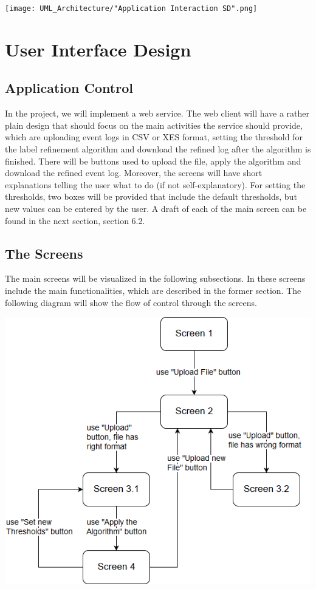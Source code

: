 \documentclass[notitlepage]{article}
\begin{document}
\begin{flushleft}
\begin{landscape}
\texttt{[image: UML\_Architecture/"Application Interaction SD".png]}
\restoregeometry
\end{landscape}

\section{User Interface Design}
\subsection{Application Control}

In the project, we will implement a web service. The web client will have a rather plain design that should focus on the main activities the service should provide, which are uploading event logs in CSV or XES format, setting the threshold for the label refinement algorithm and download the refined log after the algorithm is finished. There will be buttons used to upload the file, apply the algorithm and download the refined event log. Moreover, the screens will have short explanations telling the user what to do (if not self-explanatory). For setting the thresholds, two boxes will be provided that include the default thresholds, but new values can be entered by the user. A draft of each of the main screen can be found in the next section, section 6.2.

\subsection{The Screens}

The main screens will be visualized in the following subsections. In these screens include the main functionalities, which are described in the former section. The following diagram will show the flow of control through the screens.  

\includegraphics[scale=0.7]{ScreenFlow.png}


\end{flushleft}
\end{document}

